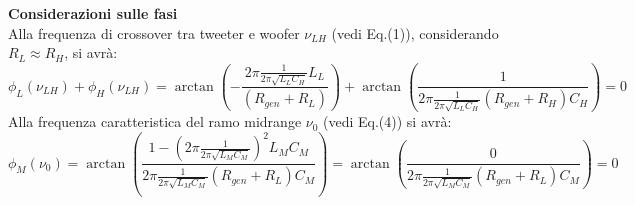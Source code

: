 \documentclass[]{article}
\begin{document}
\textbf{Considerazioni sulle fasi}\\
Alla frequenza di crossover tra tweeter e woofer $\nu_{LH}$ (vedi Eq.(1)), considerando $ R_{L} \approx R_{H} $, si avrà:
\begin{equation}
\phi_{L}(\nu_{LH})+\phi_{H}(\nu_{LH})  = \arctan \left( -\frac{2\pi\frac{1}{2\pi\sqrt{L_{L}C_{H}}} L_{L}}{(R_{gen}+R_{L})}\right)+\arctan \left( \frac{1}{2\pi\frac{1}{2\pi\sqrt{L_{L}C_{H}}} (R_{gen}+R_{H})C_{H}}\right)=0 
\end{equation} 
Alla frequenza caratteristica del ramo midrange $\nu_{0}$ (vedi Eq.(4)) si avrà:
\begin{equation}
	\phi_{M}(\nu_{0})=\arctan \left( \frac{1-(2\pi\frac{1}{2\pi\sqrt{L_M C_M}})^{2}L_{M}C_{M}}{ 2\pi\frac{1}{2\pi\sqrt{L_M C_M}} (R_{gen}+R_{L})C_{M}}\right)=\arctan \left( \frac{0}{ 2\pi\frac{1}{2\pi\sqrt{L_M C_M}} (R_{gen}+R_{L})C_{M}}\right)=0
\end{equation}
\end{document}
